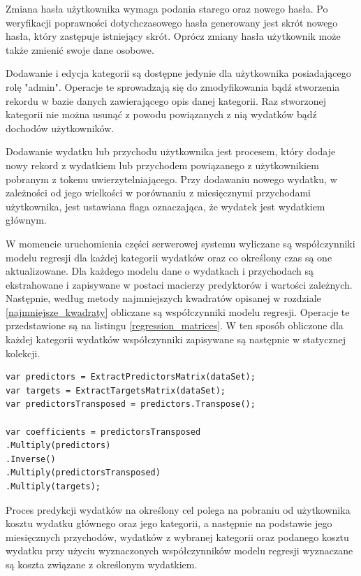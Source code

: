 Zmiana hasła użytkownika wymaga podania starego oraz nowego hasła. Po weryfikacji poprawności dotychczasowego hasła generowany jest skrót nowego hasła, który zastępuje istniejący skrót. Oprócz zmiany hasła użytkownik może także zmienić swoje dane osobowe.

Dodawanie i edycja kategorii są dostępne jedynie dla użytkownika posiadającego rolę "admin". Operacje te sprowadzają się do zmodyfikowania bądź stworzenia rekordu w bazie danych zawierającego opis danej kategorii. Raz stworzonej kategorii nie można usunąć z powodu powiązanych z nią wydatków bądź dochodów użytkowników.

Dodawanie wydatku lub przychodu użytkownika jest procesem, który dodaje nowy rekord z wydatkiem lub przychodem powiązanego z użytkownikiem pobranym z tokenu uwierzytelniającego. Przy dodawaniu nowego wydatku, w zależności od jego wielkości w porównaniu z miesięcznymi przychodami użytkownika, jest ustawiana flaga oznaczająca, że wydatek jest wydatkiem głównym.

W momencie uruchomienia części serwerowej systemu wyliczane są współczynniki modelu regresji dla każdej kategorii wydatków oraz co określony czas są one aktualizowane. Dla każdego modelu dane o wydatkach i przychodach są ekstrahowane i zapisywane w postaci macierzy predyktorów i wartości zależnych. Następnie, według metody najmniejszych kwadratów opisanej w rozdziale \ref{najmniejsze_kwadraty} obliczane są współczynniki modelu regresji. Operacje te przedstawione są na listingu \ref{regression_matrices}. W ten sposób obliczone dla każdej kategorii wydatków współczynniki zapisywane są następnie w statycznej kolekcji.
\begin{lstlisting}[label={regression_matrices}, caption={Operacje na macierzach przy użyciu biblioteki MathNet.Numerics.}, captionpos=b]
var predictors = ExtractPredictorsMatrix(dataSet);
var targets = ExtractTargetsMatrix(dataSet);
var predictorsTransposed = predictors.Transpose();

var coefficients = predictorsTransposed
.Multiply(predictors)
.Inverse()
.Multiply(predictorsTransposed)
.Multiply(targets);
\end{lstlisting}

Proces predykcji wydatków na określony cel polega na pobraniu od użytkownika kosztu wydatku głównego oraz jego kategorii, a następnie na podstawie jego miesięcznych przychodów, wydatków z wybranej kategorii oraz podanego kosztu wydatku przy użyciu wyznaczonych współczynników modelu regresji wyznaczane są koszta związane z określonym wydatkiem.
